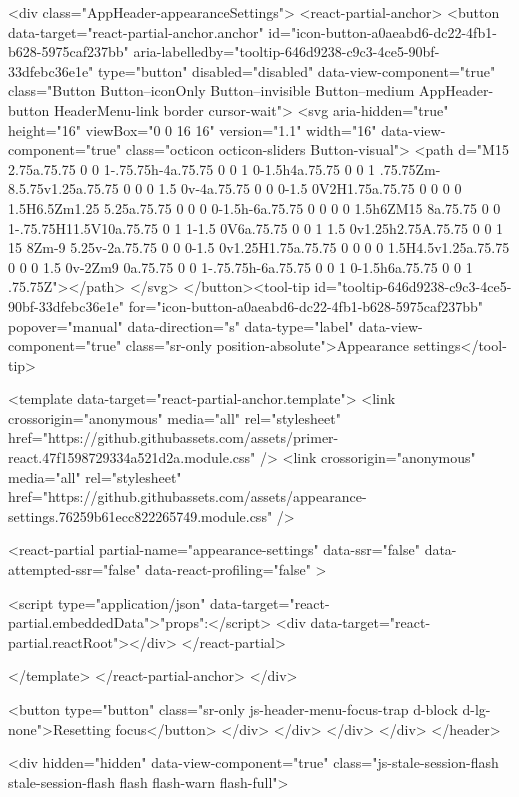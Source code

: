                <div class="AppHeader-appearanceSettings">
    <react-partial-anchor>
      <button data-target="react-partial-anchor.anchor" id="icon-button-a0aeabd6-dc22-4fb1-b628-5975caf237bb" aria-labelledby="tooltip-646d9238-c9c3-4ce5-90bf-33dfebc36e1e" type="button" disabled="disabled" data-view-component="true" class="Button Button--iconOnly Button--invisible Button--medium AppHeader-button HeaderMenu-link border cursor-wait">  <svg aria-hidden="true" height="16" viewBox="0 0 16 16" version="1.1" width="16" data-view-component="true" class="octicon octicon-sliders Button-visual">
    <path d="M15 2.75a.75.75 0 0 1-.75.75h-4a.75.75 0 0 1 0-1.5h4a.75.75 0 0 1 .75.75Zm-8.5.75v1.25a.75.75 0 0 0 1.5 0v-4a.75.75 0 0 0-1.5 0V2H1.75a.75.75 0 0 0 0 1.5H6.5Zm1.25 5.25a.75.75 0 0 0 0-1.5h-6a.75.75 0 0 0 0 1.5h6ZM15 8a.75.75 0 0 1-.75.75H11.5V10a.75.75 0 1 1-1.5 0V6a.75.75 0 0 1 1.5 0v1.25h2.75A.75.75 0 0 1 15 8Zm-9 5.25v-2a.75.75 0 0 0-1.5 0v1.25H1.75a.75.75 0 0 0 0 1.5H4.5v1.25a.75.75 0 0 0 1.5 0v-2Zm9 0a.75.75 0 0 1-.75.75h-6a.75.75 0 0 1 0-1.5h6a.75.75 0 0 1 .75.75Z"></path>
</svg>
</button><tool-tip id="tooltip-646d9238-c9c3-4ce5-90bf-33dfebc36e1e" for="icon-button-a0aeabd6-dc22-4fb1-b628-5975caf237bb" popover="manual" data-direction="s" data-type="label" data-view-component="true" class="sr-only position-absolute">Appearance settings</tool-tip>

      <template data-target="react-partial-anchor.template">
        <link crossorigin="anonymous" media="all" rel="stylesheet" href="https://github.githubassets.com/assets/primer-react.47f1598729334a521d2a.module.css" />
<link crossorigin="anonymous" media="all" rel="stylesheet" href="https://github.githubassets.com/assets/appearance-settings.76259b61ecc822265749.module.css" />

<react-partial
  partial-name="appearance-settings"
  data-ssr="false"
  data-attempted-ssr="false"
  data-react-profiling="false"
>
  
  <script type="application/json" data-target="react-partial.embeddedData">{"props":{}}</script>
  <div data-target="react-partial.reactRoot"></div>
</react-partial>

      </template>
    </react-partial-anchor>
  </div>

          <button type="button" class="sr-only js-header-menu-focus-trap d-block d-lg-none">Resetting focus</button>
        </div>
      </div>
    </div>
  </div>
</header>

      <div hidden="hidden" data-view-component="true" class="js-stale-session-flash stale-session-flash flash flash-warn flash-full">
  
